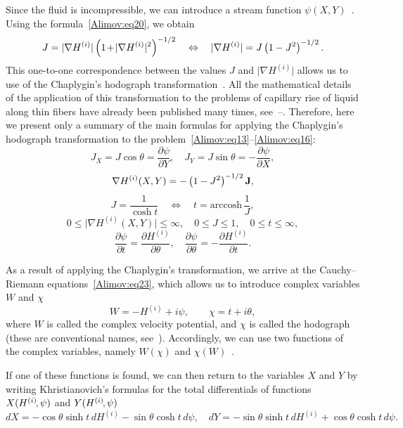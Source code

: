 \documentclass[
11pt,%
tightenlines,%
twoside,%
onecolumn,%
nofloats,%
nobibnotes,%
nofootinbib,%
superscriptaddress,%
noshowpacs,%
centertags]%
{revtex4-2}
\begin{document}
Since the fluid is incompressible, we can introduce a stream function $\psi
(X,Y)$~\cite{Alimov:bib18}. Using the formula~\eqref{Alimov:eq20}, we obtain
\[
J = \vert \nabla H^{(i)}\vert \left( {1\hspace{-0.5mm}+\hspace{-0.5mm}\vert \nabla H^{(i)}\vert^2}
\right)^{-1/2}\quad \Leftrightarrow \quad \vert \nabla H^{(i)}\vert = J\left( {1-J^2}
\right)^{-1/2}.
\]
This one-to-one correspondence between the values $J$ and $\vert \nabla H^{(i)}\vert $ allows us to
use of the Chaplygin's hodograph transformation~\cite{Alimov:bib17}. All the mathematical details
of the application of this transformation to the problems of capillary rise of liquid along thin
fibers have already been published many times, see~\cite{Alimov:bib5}--\cite{Alimov:bib8}.
Therefore, here we present only a summary of the main formulas for applying the Chaplygin's
hodograph transformation to the problem~\eqref{Alimov:eq13}--\eqref{Alimov:eq16}:
\begin{equation}
\label{Alimov:eq21} J_X = J\cos \theta = \frac{\partial \psi}{\partial Y},\quad J_Y = J\sin \theta
=-\frac{\partial \psi}{\partial X},
\end{equation}
\[
\nabla H^{(i)}(X,Y) = -\left( {1-J^2} \right)^{-1/2}{\rm {\bf J}},
\]
\begin{equation}
\label{Alimov:eq22} J = \frac{1}{\cosh t} \quad  \Leftrightarrow \quad t = \mbox{arccosh}\,
\frac{1}{J},
\end{equation}
\[
0 \le \vert \nabla H^{(i)}(X,Y)\vert \le \infty ,\quad 0\le J\le 1,\quad 0\le t \le \infty,
\]
\begin{equation}
\label{Alimov:eq23} \frac{\partial \psi}{\partial t} = \frac{\partial H^{(i)}}{\partial \theta},
\quad \frac{\partial \psi}{\partial\theta } = -\frac{\partial H^{(i)}}{\partial t}.
\end{equation}

As a result of applying the Chaplygin's transformation, we arrive at the Cauchy--Riemann
equations~\eqref{Alimov:eq23}, which allows us to introduce complex variables $W$ and $\chi$
\[
W = - H^{(i)} + i \psi,\quad \quad \chi = t + i\theta,
\]
where $W$ is called the complex velocity potential, and $\chi $ is called the hodograph
(these are conventional names, see~\cite{Alimov:bib16}). Accordingly, we can use two functions of
the complex variables, namely $W(\chi)$ and $\chi(W)$~\cite{Alimov:bib19}.

If one of these functions is found, we can then return to the variables $X$ and $Y$ by writing
Khristianovich's formulas for the total differentials of functions $X(H^{(i)}\hspace{-0.5mm},\psi)$
and $Y(H^{(i)}\hspace{-0.5mm},\psi)$~\cite{Alimov:bib16}
\begin{equation}
\label{Alimov:eq24} dX = - \cos \theta \sinh t\,dH^{(i)} - \sin \theta \cosh t\,d\psi ,\quad dY =
-\sin \theta \sinh t\,dH^{(i)} + \cos \theta \cosh t\,d\psi .
\end{equation}
\end{document}
